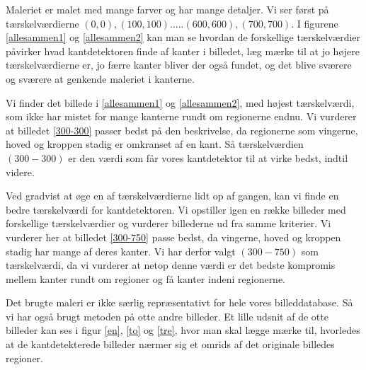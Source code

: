 Maleriet er malet med mange farver og har mange detaljer. Vi ser først
på tærskelværdierne $(0,0),(100,100).....(600,600),(700,700)$. I
figurene \ref{allesammen1} og \ref{allesammen2} kan man se hvordan de
forskellige tærskelværdier påvirker hvad kantdetektoren finde af kanter i
billedet, læg mærke til at jo højere tærskelværdierne er, jo færre kanter
bliver der også fundet, og det blive sværere og sværere at genkende maleriet i kanterne. 

Vi finder det billede i \ref{allesammen1} og \ref{allesammen2}, med
højest tærskelværdi, som ikke har mistet for mange kanterne rundt om
regionerne endnu. Vi vurderer at billedet \ref{300-300} passer bedst på
den beskrivelse, da regionerne som vingerne, hoved og kroppen stadig er
omkranset af en kant. Så tærskelværdien $(300-300)$ er den værdi som får
vores kantdetektor til at virke bedst, indtil videre.

Ved gradvist at øge en af tærskelværdierne lidt op af gangen, kan vi finde en
bedre tærskelværdi for kantdetektoren. Vi opstiller igen en række
billeder med forskellige tærskelværdier og vurderer billederne ud fra
samme kriterier. Vi vurderer her at billedet \ref{300-750} passe bedst,
da vingerne, hoved og kroppen stadig har mange af deres kanter. Vi har
derfor valgt $(300-750)$ som tærskelværdi, da vi vurderer at netop denne
værdi er det bedste kompromis mellem kanter rundt om regioner og få
kanter indeni regionerne.

Det brugte maleri er ikke særlig repræsentativt for hele vores
billeddatabase. Så vi har også brugt metoden på otte andre billeder. Et
lille udsnit af de otte billeder kan ses i figur \ref{en}, \ref{to} og
\ref{tre}, hvor man skal lægge mærke til, hvorledes at de
kantdetekterede billeder nærmer sig et omrids af det originale billedes
regioner.


